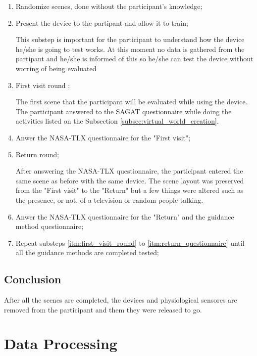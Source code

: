 \begin{enumerate}[label = 2.\arabic* --]
    \setlength\itemindent{4ex}
    \item Randomize scenes, done without the participant's knowledge;
    \item Present the device to the partipant and allow it to train;
    
    This substep is important for the participant to understand how the device he/she is going to test works. At this moment no data is gathered from the partipant and he/she is informed of this so he/she can test the device without worring of being evaluated

    \item First visit round \label{itm:first_visit_round};
    
    The first scene that the participant will be evaluated while using the device. The participant answered to the SAGAT questionnaire while doing the activities listed on the Subsection \ref{subsec:virtual_world_creation}.

    \item Anwer the NASA-TLX questionnaire for the "First visit";
    \item Return round;
    
    After answering the NASA-TLX questionnaire, the participant entered the same scene as before with the same device. The scene layout was preserved from the "First visit" to the "Return" but a few things were altered such as the presence, or not, of a television or random people talking.
    
    \item Anwer the NASA-TLX questionnaire for the "Return" and the guidance method questionnaire; \label{itm:return_questionnaire}
    
    \item Repeat substeps \ref{itm:first_visit_round} to \ref{itm:return_questionnaire} until all the guidance methods are completed tested;
\end{enumerate}

\subsection{Conclusion}
\label{subsec:conclusion}

After all the scenes are completed, the devices and physiological sensores are removed from the participant and them they were released to go.


\section{Data Processing}

